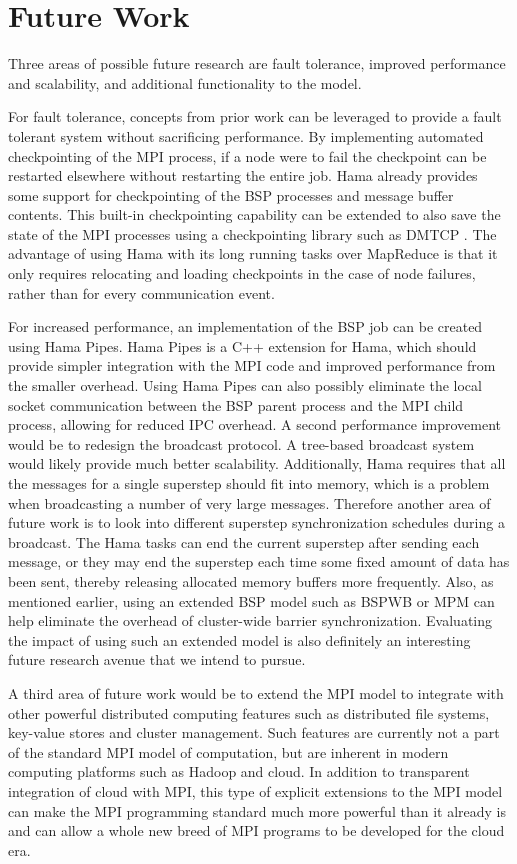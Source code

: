 \documentclass[conference,10pt] {IEEEtran}
\begin{document}
\section{Future Work}
\label{sec:futurework}
Three areas of possible future research are fault tolerance,
improved performance and scalability, and additional functionality
to the model. 

For fault tolerance, concepts from prior work can be leveraged to provide a fault tolerant system without sacrificing performance. By implementing automated checkpointing of the MPI process, if a node were to fail the checkpoint can be restarted elsewhere without restarting the entire job. Hama already provides some support for checkpointing of the BSP processes and message buffer contents. This built-in checkpointing capability can be extended to also save the state of the MPI processes using a checkpointing library such as DMTCP \cite{url:dmtcp}. The advantage of using Hama with its long running tasks over MapReduce is that it only requires relocating and loading checkpoints in the case of node failures, rather than for every communication event.

For increased performance, an implementation of the BSP job can be created using Hama
Pipes. Hama Pipes is a C++ extension for Hama, which
should provide simpler integration with the MPI code
and improved performance from the smaller overhead.
Using Hama Pipes can also possibly eliminate the local socket
communication between the BSP parent process and
the MPI child process, allowing for reduced IPC overhead. A second performance improvement
would be to redesign the broadcast protocol. A tree-based broadcast system would likely provide much better scalability. Additionally, Hama requires that all the messages for a single superstep should fit
into memory, which is a problem when broadcasting
a number of very large messages. Therefore another area of future
work is to look into different superstep synchronization schedules during a broadcast. The Hama tasks
can end the current superstep after sending each message, or they may end the superstep each time some fixed amount of data has been sent, thereby releasing allocated memory buffers more frequently. Also, as mentioned earlier, using an extended BSP model such as BSPWB or MPM can help eliminate the overhead of cluster-wide barrier synchronization. Evaluating the impact of using such an extended model is also definitely an interesting future research avenue that we intend to pursue.

A third area of future work would be to extend the MPI model to integrate with other powerful distributed computing features such as distributed file systems, key-value stores and cluster management. Such features are currently not a part of the standard MPI model of computation, but are inherent in modern computing platforms such as Hadoop and cloud. In addition to transparent integration of cloud with MPI, this type of explicit extensions to the MPI model can make the MPI programming standard much more powerful than it already is and can allow a whole new breed of MPI programs to be developed for the cloud era.
 
\end{document}
